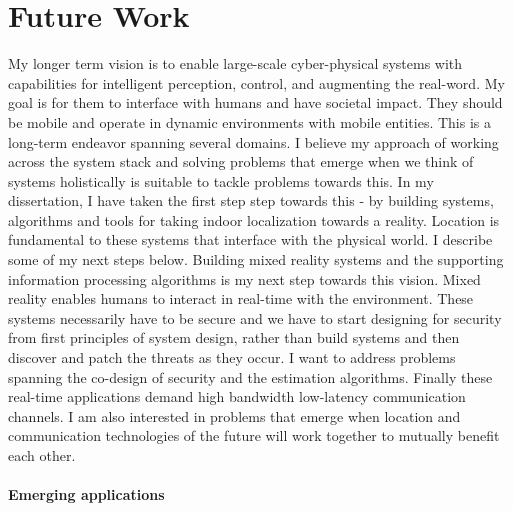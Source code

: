 \documentclass[10pt]{article}
\begin{document}
\section{Future Work}
My longer term vision is to enable large-scale cyber-physical systems with capabilities for intelligent perception, control, and augmenting the real-word. My goal is for them to interface with humans and have societal impact. They should be mobile and operate in dynamic environments with mobile entities. This is a long-term endeavor spanning several domains. I believe my approach of working across the system stack and solving problems that emerge when we think of systems holistically is suitable to tackle problems towards this. In my dissertation, I have taken the first step step towards this - by building systems, algorithms and tools for taking indoor localization towards a reality. Location is fundamental to these systems that interface with the physical world.  I describe some of my next steps below. 
Building mixed reality systems and the supporting information processing algorithms is my next step towards this vision. Mixed reality enables humans to interact in real-time with the environment. 
These systems necessarily have to be secure and we have to start designing for security from first principles of system design, rather than build systems and then discover and patch the threats as they occur. I want to address problems spanning the co-design of security and the estimation algorithms. Finally these real-time applications demand high bandwidth low-latency communication channels. I am also interested in problems that emerge when location and communication technologies of the future will work together to mutually benefit each other.

\paragraph{Emerging applications}
\end{document}
